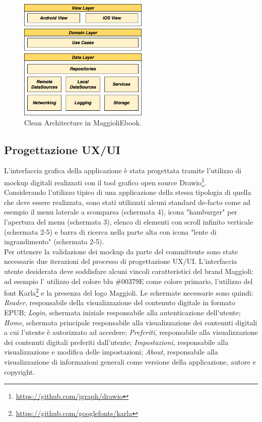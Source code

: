 \begin{figure}[H]
\centering
\includegraphics[width=0.55\textwidth]{img/tesi-2-Page-18.drawio.png}
\caption{Clean Architecture in MaggioliEbook.}
\end{figure}

\subsection{Progettazione UX/UI}

L'interfaccia grafica della applicazione è stata progettata tramite l'utilizzo di mockup digitali realizzati con il tool grafico open source Drawio\footnote{\url{https://github.com/jgraph/drawio}}.\\
Considerando l'utilizzo tipico di una applicazione della stessa tipologia di quella che deve essere realizzata, sono stati utilizzati alcuni standard de-facto come ad esempio il menu laterale a scomparsa (schermata 4), icona "hamburger" per l'apertura del menu (schermata 3), elenco di elementi con scroll infinito verticale (schermata 2-5) e barra di ricerca nella parte alta con icona "lente di ingrandimento" (schermata 2-5).\\
Per ottenere la validazione dei mockup da parte del committente sono state necessarie due iterazioni del processo di progettazione UX/UI. L'interfaccia utente desiderata deve soddisfare alcuni vincoli caratteristici del brand Maggioli: ad esempio l' utilizzo del colore blu \#00379E come colore primario, l'utilizzo del font Karla\footnote{\url{https://github.com/googlefonts/karla}} e la presenza del logo Maggioli. Le schermate necessarie sono quindi: \textit{Reader}, responsabile della visualizzazione del contenuto digitale in formato EPUB; \textit{Login}, schermata iniziale responsabile alla autenticazione dell'utente; \textit{Home}, schermata principale responsabile alla visualizzazione dei contenuti digitali a cui l'utente è autorizzato ad accedere; \textit{Preferiti}, responsabile alla visualizzazione dei contenuti digitali preferiti dall'utente; \textit{Impostazioni}, responsabile alla visualizzazione e modifica delle impostazioni; \textit{About}, responsabile alla visualizzazione di informazioni generali come versione della applicazione, autore e copyright.

